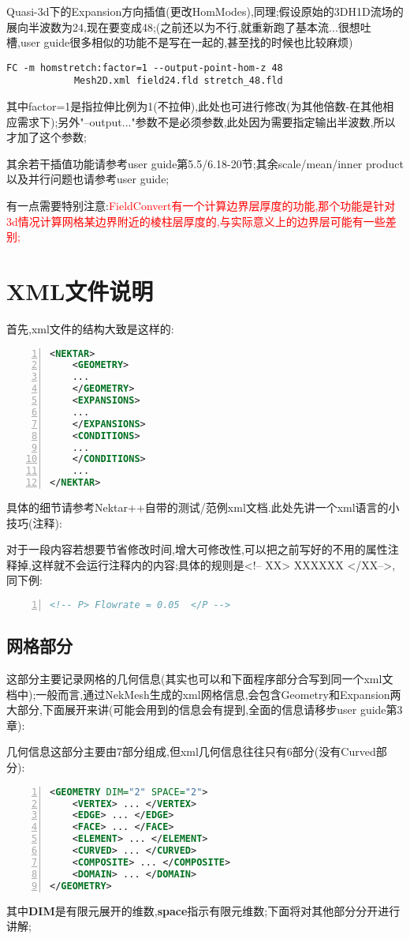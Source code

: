 Quasi-3d下的Expansion方向插值(更改HomModes),同理;假设原始的3DH1D流场的展向半波数为24,现在要变成48;(之前还以为不行,就重新跑了基本流...很想吐槽,user guide很多相似的功能不是写在一起的,甚至找的时候也比较麻烦)
\begin{lstlisting}[frame=single]
FC -m homstretch:factor=1 --output-point-hom-z 48 
			Mesh2D.xml field24.fld stretch_48.fld
\end{lstlisting}
\par
其中factor=1是指拉伸比例为1(不拉伸),此处也可进行修改(为其他倍数-在其他相应需求下);另外"--output..."参数不是必须参数,此处因为需要指定输出半波数,所以才加了这个参数;

其余若干插值功能请参考user guide第5.5/6.18-20节;其余scale/mean/inner product以及并行问题也请参考user guide;\par
有一点需要特别注意:\textcolor{red}{FieldConvert有一个计算边界层厚度的功能,那个功能是针对3d情况计算网格某边界附近的棱柱层厚度的,与实际意义上的边界层可能有一些差别;}

\section{XML文件说明}
首先,xml文件的结构大致是这样的:
\begin{lstlisting}[frame=single,numbers=left,language=XML]
<NEKTAR>
	<GEOMETRY>
	...
	</GEOMETRY>
	<EXPANSIONS>
	...
	</EXPANSIONS>
	<CONDITIONS>
	...
	</CONDITIONS>
	...
</NEKTAR>
\end{lstlisting}
\par
具体的细节请参考Nektar++自带的测试/范例xml文档.此处先讲一个xml语言的小技巧(注释):\par
对于一段内容若想要节省修改时间,增大可修改性,可以把之前写好的不用的属性注释掉,这样就不会运行注释内的内容;具体的规则是<!-- XX>  XXXXXX </XX-->,同下例:\par
\begin{lstlisting}[frame=single,numbers=left,language=XML]
<!-- P> Flowrate = 0.05  </P -->
\end{lstlisting}
\par

\subsection{网格部分}
这部分主要记录网格的几何信息(其实也可以和下面程序部分合写到同一个xml文档中);一般而言,通过NekMesh生成的xml网格信息,会包含Geometry和Expansion两大部分,下面展开来讲(可能会用到的信息会有提到,全面的信息请移步user guide第3章):\par
几何信息这部分主要由7部分组成,但xml几何信息往往只有6部分(没有Curved部分):
\begin{lstlisting}[frame=single,numbers=left,language=XML]
<GEOMETRY DIM="2" SPACE="2">
	<VERTEX> ... </VERTEX>
	<EDGE> ... </EDGE>
	<FACE> ... </FACE>
	<ELEMENT> ... </ELEMENT>
	<CURVED> ... </CURVED>
	<COMPOSITE> ... </COMPOSITE>
	<DOMAIN> ... </DOMAIN>
</GEOMETRY>
\end{lstlisting}
\par
其中\textbf{DIM}是有限元展开的维数,\textbf{space}指示有限元维数;下面将对其他部分分开进行讲解;

